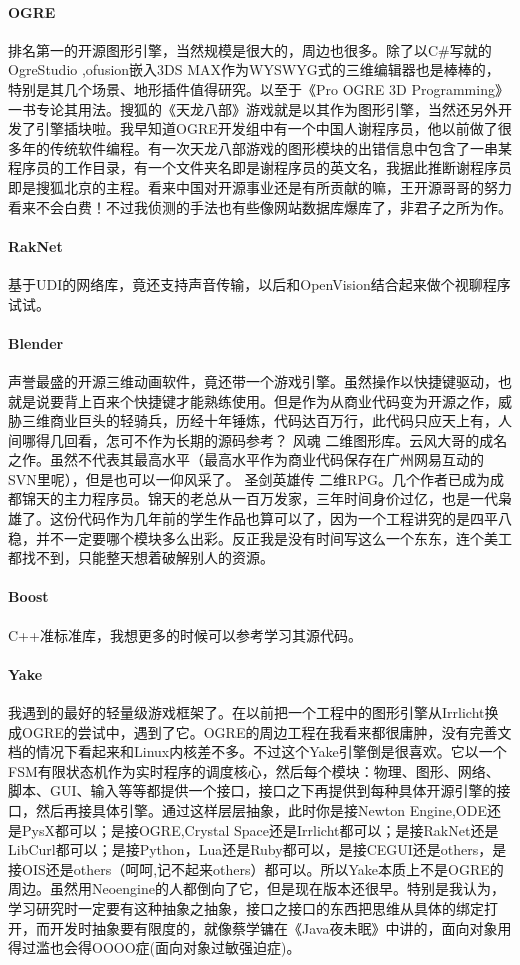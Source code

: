 \documentclass[UTF8,a4paper,8pt]{ctexart}
\begin{document}
\paragraph{OGRE}
排名第一的开源图形引擎，当然规模是很大的，周边也很多。除了以C\#写就的OgreStudio ,ofusion嵌入3DS MAX作为WYSWYG式的三维编辑器也是棒棒的，特别是其几个场景、地形插件值得研究。以至于《Pro OGRE 3D Programming》一书专论其用法。搜狐的《天龙八部》游戏就是以其作为图形引擎，当然还另外开发了引擎插块啦。我早知道OGRE开发组中有一个中国人谢程序员，他以前做了很多年的传统软件编程。有一次天龙八部游戏的图形模块的出错信息中包含了一串某程序员的工作目录，有一个文件夹名即是谢程序员的英文名，我据此推断谢程序员即是搜狐北京的主程。看来中国对开源事业还是有所贡献的嘛，王开源哥哥的努力看来不会白费！不过我侦测的手法也有些像网站数据库爆库了，非君子之所为作。
\paragraph{RakNet}
基于UDI的网络库，竟还支持声音传输，以后和OpenVision结合起来做个视聊程序试试。
\paragraph{Blender}
声誉最盛的开源三维动画软件，竟还带一个游戏引擎。虽然操作以快捷键驱动，也就是说要背上百来个快捷键才能熟练使用。但是作为从商业代码变为开源之作，威胁三维商业巨头的轻骑兵，历经十年锤炼，代码达百万行，此代码只应天上有，人间哪得几回看，怎可不作为长期的源码参考？
风魂
二维图形库。云风大哥的成名之作。虽然不代表其最高水平（最高水平作为商业代码保存在广州网易互动的SVN里呢），但是也可以一仰风采了。
圣剑英雄传
二维RPG。几个作者已成为成都锦天的主力程序员。锦天的老总从一百万发家，三年时间身价过亿，也是一代枭雄了。这份代码作为几年前的学生作品也算可以了，因为一个工程讲究的是四平八稳，并不一定要哪个模块多么出彩。反正我是没有时间写这么一个东东，连个美工都找不到，只能整天想着破解别人的资源。
\paragraph{Boost}
C++准标准库，我想更多的时候可以参考学习其源代码。
\paragraph{Yake}
我遇到的最好的轻量级游戏框架了。在以前把一个工程中的图形引擎从Irrlicht换成OGRE的尝试中，遇到了它。OGRE的周边工程在我看来都很庸肿，没有完善文档的情况下看起来和Linux内核差不多。不过这个Yake引擎倒是很喜欢。它以一个FSM有限状态机作为实时程序的调度核心，然后每个模块：物理、图形、网络、脚本、GUI、输入等等都提供一个接口，接口之下再提供到每种具体开源引擎的接口，然后再接具体引擎。通过这样层层抽象，此时你是接Newton Engine,ODE还是PysX都可以；是接OGRE,Crystal Space还是Irrlicht都可以；是接RakNet还是LibCurl都可以；是接Python，Lua还是Ruby都可以，是接CEGUI还是others，是接OIS还是others（呵呵,记不起来others）都可以。所以Yake本质上不是OGRE的周边。虽然用Neoengine的人都倒向了它，但是现在版本还很早。特别是我认为，学习研究时一定要有这种抽象之抽象，接口之接口的东西把思维从具体的绑定打开，而开发时抽象要有限度的，就像蔡学镛在《Java夜未眠》中讲的，面向对象用得过滥也会得OOOO症(面向对象过敏强迫症)。
\end{document}
